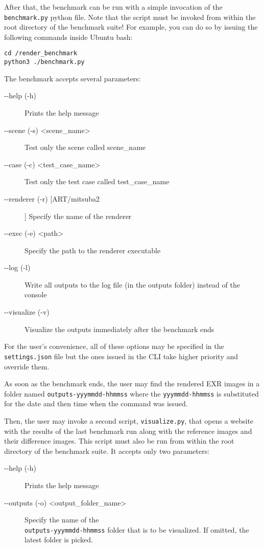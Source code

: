 \documentclass[12pt,a4paper]{report}
\begin{document}
After that, the benchmark can be run with a simple invocation of the \\ \texttt{benchmark.py} python file. Note that the script must be invoked from within the root directory of the benchmark suite! For example, you can do so by issuing the following commands inside Ubuntu bash:

\begin{lstlisting}
cd /render_benchmark
python3 ./benchmark.py
\end{lstlisting}

The benchmark accepts several parameters:
\begin{description}
	\item[-{}-help (-h)] Prints the help message
	\item[-{}-scene (-s) \textless scene\_name\textgreater] Test only the scene called scene\_name
	\item[-{}-case (-c) \textless test\_case\_name\textgreater] Test only the test case called test\_case\_name
	\item[-{}-renderer (-r) [ART/mitsuba2]] Specify the name of the renderer 
	\item[-{}-exec (-e) \textless path\textgreater] Specify the path to the renderer executable
	\item[-{}-log (-l)] Write all outputs to the log file (in the outputs folder) instead of the console
	\item[-{}-visualize (-v)] Visualize the outputs immediately after the benchmark ends
\end{description}

For the user's convenience, all of these options may be specified in the \\ \texttt{settings.json} file but the ones issued in the CLI take higher priority and override them.

As soon as the benchmark ends, the user may find the rendered EXR images in a folder named \texttt{outputs-yyymmdd-hhmmss} where the \texttt{yyymmdd-hhmmss} is substituted for the date and then time when the command was issued.

Then, the user may invoke a second script, \texttt{visualize.py}, that opens a website with the results of the last benchmark run along with the reference images and their difference images. This script must also be run from within the root directory of the benchmark suite. It accepts only two parameters:

\begin{description}
	\item[-{}-help (-h)] Prints the help message
	\item[-{}-outputs (-o) \textless output\_folder\_name\textgreater] Specify the name of the\\ \texttt{outputs-yyymmdd-hhmmss} folder that is to be visualized. If omitted, the latest folder is picked.
\end{description}
\end{document}
